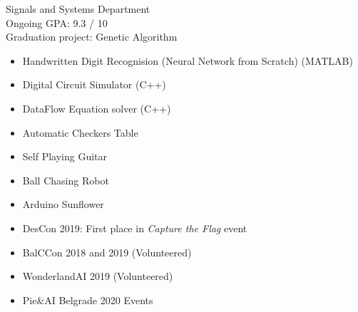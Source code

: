 


Signals and Systems Department\\
Ongoing GPA: 9.3 / 10
\\
\smallskip
{}
Graduation project: Genetic Algorithm








    \begin{itemize}
        \item Handwritten Digit Recognision (Neural Network from Scratch) (MATLAB)
        \item Digital Circuit Simulator (C++)
        \item DataFlow Equation solver (C++)
    \end{itemize}

    \begin{itemize}
        \item Automatic Checkers Table
        \item Self Playing Guitar
        \item Ball Chasing Robot
        \item Arduino Sunflower
    \end{itemize}
    
    
    \begin{itemize}
        \item DesCon 2019: First place in \textit{Capture the Flag} event
        \item BalCCon 2018 and 2019 (Volunteered)
        \item WonderlandAI 2019 (Volunteered)
        \item Pie\&AI Belgrade 2020 Events
    \end{itemize}
    
